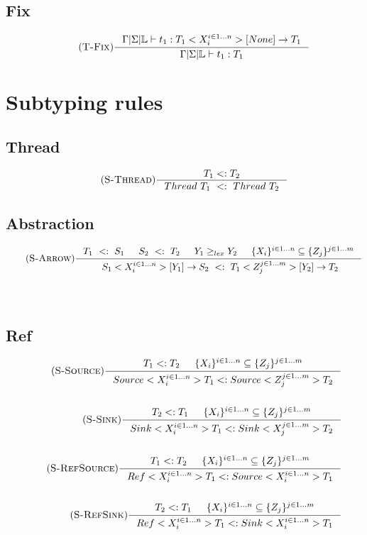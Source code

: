 \documentclass[12pt]{article}
\def\lock {\mathbb{L}}
\begin{document}
\subsection{Fix}
\begin{align*}
\tag {\textsc{T-Fix}}
\inference[]{\Gamma|\Sigma|\lock \vdash t_1:T_1<X_i^{i\in 1...n}>[None]->T_1}{\Gamma|\Sigma|\lock\vdash t_1:T_1}
\end{align*}

\section{Subtyping rules}

\subsection{Thread}
\begin{align*}
    \tag {\textsc{S-Thread}}
    \inference[]{T_1 <: T_2}{ Thread~T_1~<:~Thread~T_2}
\end{align*}

\subsection{Abstraction}
\begin{align*}
\tag {\textsc{S-Arrow}}
\inference[]{
    T_1~<:~S_1 & S_2~<:~T_2 & Y_1 \ge_{lex} Y_2 &\{X_i\}^{i\in 1...n} \subseteq   \{Z_j\}^{j\in 1...m}
    }{~S_1<X_i^{i\in 1...n}>[Y_1]\rightarrow S_2~<:~T_1<Z_j^{j\in 1...m}>[Y_2]\rightarrow T_2}
    \\
    \\
\\
\end{align*}

\subsection{Ref}
\begin{align*}
    \tag{\textsc{S-Source}}
    \inference[]{T_1 <: T_2 & \{X_i\}^{i\in 1...n} \subseteq   \{Z_j\}^{j\in 1...m}}{Source<X_i^{i\in 1...n}>T_1 <: Source<Z_j^{j\in 1...m}>T_2}
    \\
    \\
    \tag{\textsc{S-Sink}}
    \inference[]{T_2 <: T_1 & \{X_i\}^{i\in 1...n} \subseteq   \{Z_j\}^{j\in 1...m}}{Sink<X_i^{i\in 1...n}>T_1 <: Sink<X_j^{j\in 1...m}>T_2}
    \\
    \\
    \tag{\textsc{S-RefSource}}
    \inference[]{T_1<:T_2 & \{X_i\}^{i\in 1...n} \subseteq   \{Z_j\}^{j\in 1...m}}{
    Ref<X_i^{i\in 1...n}>T_1 <: Source<X_i^{i\in 1...n}>T_1}
    \\
    \\
    \tag{\textsc{S-RefSink}}
    \inference[]{T_2<:T_1 & \{X_i\}^{i\in 1...n} \subseteq   \{Z_j\}^{j\in 1...m}}
    {Ref<X_i^{i\in 1...n}>T_1 <: Sink<X_i^{i\in 1...n}>T_1}
    \\
    \\
\end{align*}
\end{document}
